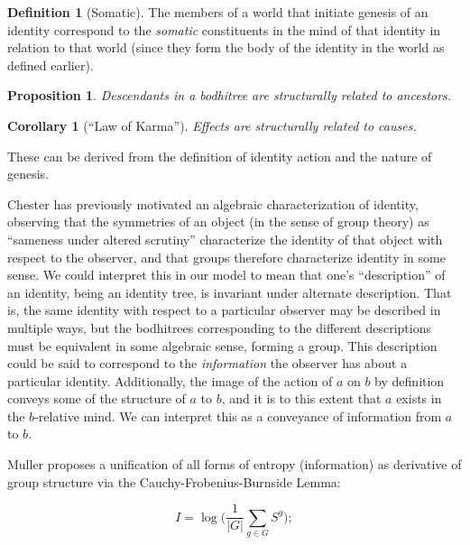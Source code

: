 \documentclass[pra,twocolumn,groupedaddress,10pt]{revtex4}
\newtheorem{proposition}[theorem]{Proposition}
\newtheorem{corollary}[theorem]{Corollary}
\theoremstyle{definition}
\newtheorem{defn}{Definition}[section]
\begin{document}
\begin{defn}[Somatic]
	The members of a world that initiate genesis of an identity correspond to the \emph{somatic} constituents in the mind of that identity in relation to that world (since they form the body of the identity in the world as defined earlier).
\end{defn}

\begin{proposition}
	Descendants in a bodhitree are structurally related to ancestors.
\end{proposition}

\begin{corollary}[``Law of Karma'']
	Effects are structurally related to causes.
\end{corollary}

These can be derived from the definition of identity action and the nature of genesis.

Chester\cite{chester} has previously motivated an algebraic characterization of identity, observing that the symmetries of an object (in the sense of group theory) as ``sameness under altered scrutiny'' characterize the identity of that object with respect to the observer, and that groups therefore characterize identity in some sense. We could interpret this in our model to mean that one's ``description'' of an identity, being an identity tree, is invariant under alternate description. That is, the same identity with respect to a particular observer may be described in multiple ways, but the bodhitrees corresponding to the different descriptions must be equivalent in some algebraic sense, forming a group. This description could be said to correspond to the \emph{information} the observer has about a particular identity. Additionally, the image of the action of $a$ on $b$ by definition conveys some of the structure of $a$ to $b$, and it is to this extent that $a$ exists in the $b$-relative mind. We can interpret this as a conveyance of information from $a$ to $b$.

Muller\cite{muller} proposes a unification of all forms of entropy (information) as derivative of group structure via the Cauchy-Frobenius-Burnside Lemma:

\begin{equation}
	I = \log\biggl(\frac{1}{|G|} \sum_{g \in G} S^{g}\biggr) ;
\end{equation}
\end{document}
